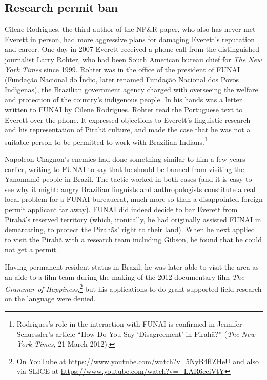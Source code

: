 \documentclass[output=paper,colorlinks,citecolor=brown
]{langscibook}
\begin{document}
\subsection{Research permit ban}

Cilene Rodrigues, the third author of the NP\&R paper, who also has never
met Everett in person, had more aggressive plans for damaging Everett's
reputation and career. One day in 2007 Everett received a phone call
from the distinguished journalist Larry Rohter, who had been South
American bureau chief for \textit{The New York Times} since 1999.
Rohter was in the office of the president of FUNAI (Funda{\c{c}}{ã}o
Nacional do {\'I}ndio, later renamed Funda{\c{c}}{ã}o Nacional dos
Povos Ind{\'\i}genas), the Brazilian government agency charged with
overseeing the welfare and protection of the country's indigenous
people. In his hands was a letter written to FUNAI by Cilene Rodrigues.
Rohter read the Portuguese text to Everett over the phone. It expressed
objections to Everett's linguistic research and his representation
of Pirahã culture, and made the case that he was not a suitable
person to be permitted to work with Brazilian Indians.\footnote{%
   Rodrigues's role in the interaction with FUNAI is confirmed in
   Jennifer Schuessler's article ``How Do You Say `Disagreement' in
   Pirahã?'' (\textit{The New York Times}, 21 March 2012).}

Napoleon Chagnon's enemies had done something similar to him a few
years earlier, writing to FUNAI to say that he should be banned from
visiting the Yanomam{\"o} people in Brazil. The tactic worked in both
cases (and it is easy to see why it might: angry Brazilian linguists and
anthropologists constitute a real local problem for a FUNAI bureaucrat,
much more so than a disappointed foreign permit applicant far away).
FUNAI did indeed decide to bar Everett from Pirahã's reserved
territory (which, ironically, he had originally assisted FUNAI in
demarcating, to protect the Pirahãs' right to their land). When
he next applied to visit the Pirahã with a research team including
Gibson, he found that he could not get a permit.

Having permanent resident status in Brazil, he was later able to visit the
area as an aide to a film team during the making of the 2012 documentary
film \textit{The Grammar of Happiness},\footnote{%
   On YouTube at \url{https://www.youtube.com/watch?v=5NyB4fIZHeU} and
   also via SLICE at \url{https://www.youtube.com/watch?v=_LAR6eeiVtY}}
but his applications to do grant-supported field research on the language
were denied.
\end{document}

